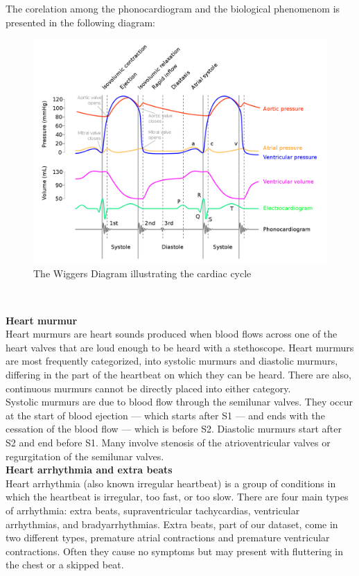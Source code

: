 \documentclass[11pt, a4papper]{report}
\theoremstyle{plain}
\theoremstyle{definition}
\theoremstyle{definition}
\theoremstyle{proposition}
\begin{document}
The corelation among the phonocardiogram and the biological phenomenom is presented in the following diagram:

\begin{figure}[h]
\includegraphics[width=14cm]{Wiggers_Diagram_2.png}
\centering
\caption{The Wiggers Diagram illustrating the cardiac cycle}
\end{figure}
\

\textbf{Heart murmur}
\\

Heart murmurs are heart sounds produced when blood flows across one of the heart valves that are loud enough to be heard with a stethoscope. Heart murmurs are most frequently categorized, into systolic murmurs and diastolic murmurs, differing in the part of the heartbeat on which they can be heard. There are also, continuous murmurs cannot be directly placed into either category.
\\

Systolic murmurs are due to blood flow through the semilunar valves. They occur at the start of blood ejection — which starts after S1 — and ends with the cessation of the blood flow — which is before S2. Diastolic murmurs start after S2 and end before S1. Many involve stenosis of the atrioventricular valves or regurgitation of the semilunar valves.
\\

\textbf{Heart arrhythmia and extra beats}
\\

Heart arrhythmia (also known irregular heartbeat) is a group of conditions in which the heartbeat is irregular, too fast, or too slow. There are four main types of arrhythmia: extra beats, supraventricular tachycardias, ventricular arrhythmias, and bradyarrhythmias. Extra beats, part of our dataset, come in two different types, premature atrial contractions and premature ventricular contractions. Often they cause no symptoms but may present with fluttering in the chest or a skipped beat.
\\
\end{document}
